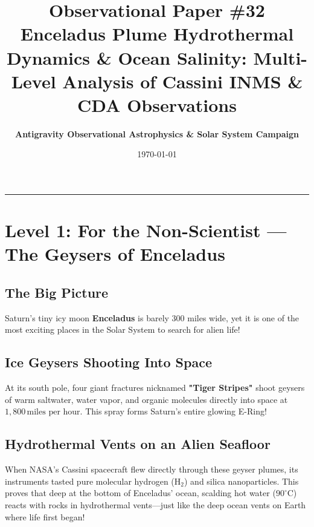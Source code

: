 \documentclass[11pt,a4paper]{article}
\title{\Huge \textbf{Observational Paper \#32}\\ \Large Enceladus Plume Hydrothermal Dynamics \& Ocean Salinity: Multi-Level Analysis of Cassini INMS \& CDA Observations}
\author{\textbf{Antigravity Observational Astrophysics \& Solar System Campaign}}
\date{\today}
\begin{document}
\maketitle

\vspace{-1em}
\begin{center}
\rule{\textwidth}{1.5pt}
\end{center}

\section*{Level 1: For the Non-Scientist — The Geysers of Enceladus}

\subsection*{The Big Picture}
Saturn's tiny icy moon \textbf{Enceladus} is barely 300 miles wide, yet it is one of the most exciting places in the Solar System to search for alien life! 

\subsection*{Ice Geysers Shooting Into Space}
At its south pole, four giant fractures nicknamed \textbf{"Tiger Stripes"} shoot geysers of warm saltwater, water vapor, and organic molecules directly into space at $1,800\,\text{miles per hour}$. This spray forms Saturn's entire glowing E-Ring!

\subsection*{Hydrothermal Vents on an Alien Seafloor}
When NASA's Cassini spacecraft flew directly through these geyser plumes, its instruments tasted pure molecular hydrogen ($\mathrm{H_2}$) and silica nanoparticles. This proves that deep at the bottom of Enceladus' ocean, scalding hot water ($90^\circ\text{C}$) reacts with rocks in hydrothermal vents—just like the deep ocean vents on Earth where life first began!

\newpage

\end{document}
